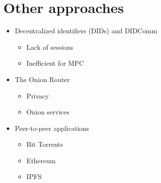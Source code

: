 \hypertarget{other-approaches}{%
\chapter{Other approaches}\label{other-approaches}}

\begin{itemize}
\tightlist
\item
  Decentralized identifiers (DIDs) and DIDComm

  \begin{itemize}
  \tightlist
  \item
    Lack of sessions
  \item
    Inefficient for MPC
  \end{itemize}
\item
  The Onion Router

  \begin{itemize}
  \tightlist
  \item
    Privacy
  \item
    Onion services
  \end{itemize}
\item
  Peer-to-peer applications

  \begin{itemize}
  \tightlist
  \item
    Bit Torrents
  \item
    Ethereum
  \item
    IPFS
  \end{itemize}
\end{itemize}

